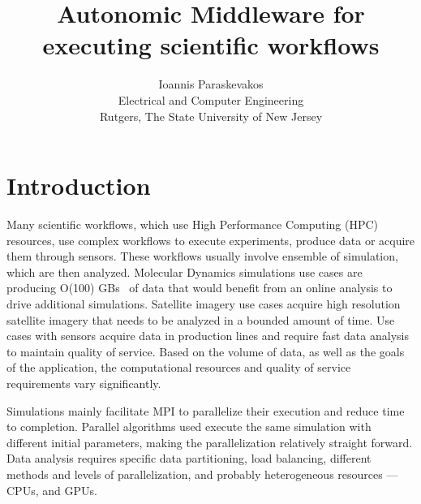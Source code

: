 

\title{Autonomic Middleware for executing scientific workflows}
\author{Ioannis Paraskevakos \\	Electrical and Computer Engineering \\Rutgers, The State University of New Jersey}


\maketitle



\section{Introduction}
Many scientific workflows, which use High Performance Computing (HPC) resources, use complex workflows to execute experiments, produce data or acquire them through sensors. These workflows usually involve ensemble of simulation, which are then analyzed. Molecular Dynamics simulations use cases are producing O(100) GBs~\cite{cheatham2015impact} of data that would benefit from an online analysis to drive additional simulations. Satellite imagery use cases acquire high resolution satellite imagery that needs to be analyzed in a bounded amount of time. Use cases with sensors acquire data in production lines and require fast data analysis to maintain quality of service. Based on the volume of data, as well as the goals of the application, the computational resources and quality of service requirements vary significantly. 


Simulations mainly facilitate MPI to parallelize their execution and reduce time to completion. Parallel algorithms used execute the same simulation with different initial parameters, making the parallelization relatively straight forward. Data analysis requires specific data partitioning, load balancing, different methods and levels of parallelization, and probably heterogeneous resources --- CPUs, and GPUs.

